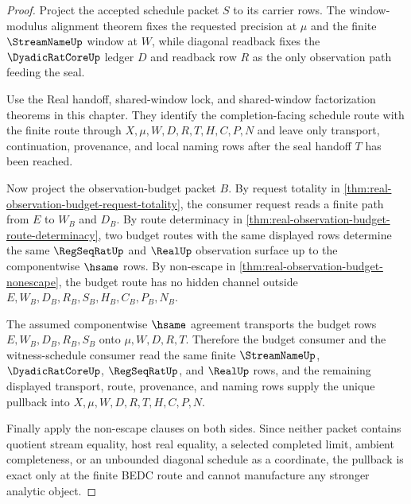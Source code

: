 \begin{proof}
Project the accepted schedule packet $S$ to its carrier rows. The window-modulus alignment theorem fixes the requested precision at $\mu$ and the finite $\StreamNameUp$ window at $W$, while diagonal readback fixes the $\DyadicRatCoreUp$ ledger $D$ and readback row $R$ as the only observation path feeding the seal.

Use the Real handoff, shared-window lock, and shared-window factorization theorems in this chapter. They identify the completion-facing schedule route with the finite route through $X,\mu,W,D,R,T,H,C,P,N$ and leave only transport, continuation, provenance, and local naming rows after the seal handoff $T$ has been reached.

Now project the observation-budget packet $B$. By request totality in \autoref{thm:real-observation-budget-request-totality}, the consumer request reads a finite path from $E$ to $W_B$ and $D_B$. By route determinacy in \autoref{thm:real-observation-budget-route-determinacy}, two budget routes with the same displayed rows determine the same $\RegSeqRatUp$ and $\RealUp$ observation surface up to the componentwise $\hsame$ rows. By non-escape in \autoref{thm:real-observation-budget-nonescape}, the budget route has no hidden channel outside $E,W_B,D_B,R_B,S_B,H_B,C_B,P_B,N_B$.

The assumed componentwise $\hsame$ agreement transports the budget rows $E,W_B,D_B,R_B,S_B$ onto $\mu,W,D,R,T$. Therefore the budget consumer and the witness-schedule consumer read the same finite $\StreamNameUp$, $\DyadicRatCoreUp$, $\RegSeqRatUp$, and $\RealUp$ rows, and the remaining displayed transport, route, provenance, and naming rows supply the unique pullback into $X,\mu,W,D,R,T,H,C,P,N$.

Finally apply the non-escape clauses on both sides. Since neither packet contains quotient stream equality, host real equality, a selected completed limit, ambient completeness, or an unbounded diagonal schedule as a coordinate, the pullback is exact only at the finite BEDC route and cannot manufacture any stronger analytic object.
\end{proof}

